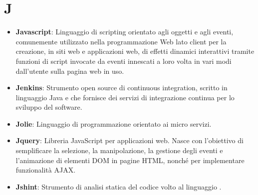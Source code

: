 \section*{J}
\begin{itemize}
	\item
	\textbf{Javascript}: Linguaggio di scripting orientato agli oggetti e agli eventi, comunemente utilizzato nella programmazione Web lato client per la creazione, in siti web e applicazioni web, di effetti dinamici interattivi tramite funzioni di script invocate da eventi innescati a loro volta in vari modi dall'utente sulla pagina web in uso.
	\item
	\textbf{Jenkins}: Strumento open source di continuous integration, scritto in linguaggio Java e che fornisce dei servizi di integrazione continua per lo sviluppo del software.
	\item
	\textbf{Jolie}: Linguaggio di programmazione orientato ai micro servizi.
	\item
	\textbf{Jquery}: Libreria JavaScript per applicazioni web. Nasce con l'obiettivo di semplificare la selezione, la manipolazione, la gestione degli eventi e l'animazione di elementi DOM in pagine HTML, nonché per implementare funzionalità AJAX.
	\item
	\textbf{Jshint}: Strumento di analisi statica del codice volto al linguaggio .
\end{itemize}
\newpage